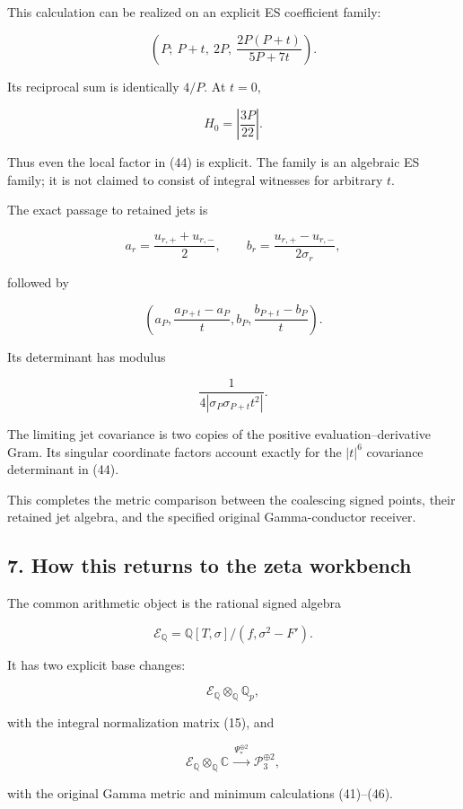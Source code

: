 This calculation can be realized on an explicit ES coefficient family:

\[
\boxed{
\left(
P;\ P+t,\ 2P,\
\frac{2P(P+t)}{5P+7t}
\right).
}
\tag{45}
\]

Its reciprocal sum is identically \(4/P\). At \(t=0\),

\[
H_0=\left|\frac{3P}{22}\right|.
\]

Thus even the local factor in (44) is explicit. The family is an
algebraic ES family; it is not claimed to consist of integral witnesses
for arbitrary \(t\).

The exact passage to retained jets is

\[
a_r=\frac{u_{r,+}+u_{r,-}}2,\qquad
b_r=\frac{u_{r,+}-u_{r,-}}{2\sigma_r},
\]

followed by

\[
\left(
a_P,\frac{a_{P+t}-a_P}{t},
b_P,\frac{b_{P+t}-b_P}{t}
\right).
\tag{46}
\]

Its determinant has modulus

\[
\frac1{4|\sigma_P\sigma_{P+t}t^2|}.
\]

The limiting jet covariance is two copies of the positive
evaluation--derivative Gram. Its singular coordinate factors account
exactly for the \(|t|^6\) covariance determinant in (44).

This completes the metric comparison between the coalescing signed
points, their retained jet algebra, and the specified original
Gamma-conductor receiver.

\subsection{7. How this returns to the zeta
workbench}\label{how-this-returns-to-the-zeta-workbench}

The common arithmetic object is the rational signed algebra

\[
\mathscr E_{\mathbb Q}
=
\mathbb Q[T,\sigma]/(f,\sigma^2-F').
\]

It has two explicit base changes:

\[
\mathscr E_{\mathbb Q}\otimes_{\mathbb Q}\mathbb Q_p,
\]

with the integral normalization matrix (15), and

\[
\mathscr E_{\mathbb Q}\otimes_{\mathbb Q}\mathbb C
\xrightarrow{\ \Psi_*^{\oplus2}\ }
\mathcal P_3^{\oplus2},
\]

with the original Gamma metric and minimum calculations (41)--(46).

